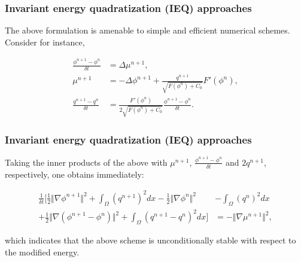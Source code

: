 \documentclass{beamer}
\begin{document}
    \begin{frame}
    \frametitle{Invariant energy quadratization (IEQ) approaches}

The above formulation is amenable to simple and efficient numerical schemes. Consider for instance,

\begin{equation}\label{DisIEQ}
  \begin{split}
\frac{\phi^{n+1}-\phi^{n}}{\delta t}&=\Delta\mu^{n+1},\\
\mu^{n+1}&=-\Delta\phi^{n+1}+\frac{q^{n+1}}{\sqrt{F(\phi^n)+C_0}}F'(\phi^n),\\
\frac{q^{n+1}-q^n}{\delta t}&=\frac{F'(\phi^n)}{2\sqrt{F(\phi^n)+C_0}}\frac{\phi^{n+1}-\phi^{n}}{\delta t}.
  \end{split}
\end{equation}

    \end{frame}
    \begin{frame}
    \frametitle{Invariant energy quadratization (IEQ) approaches}

Taking the inner products of the above with $\mu^{n+1}$, $\frac{\phi^{n+1}-\phi^n}{\delta t}$ and $2q^{n+1}$, respectively, one obtains immediately:

\begin{equation}\label{haosan}
  \begin{split}
\frac{1}{\delta t}[\frac{1}{2}\Vert\nabla\phi^{n+1}\Vert^2+\int_{\Omega}{(q^{n+1})}^2dx-\frac{1}{2}\Vert\nabla\phi^n\Vert^2&-\int_{\Omega}{(q^n)}^2dx\\
+\frac{1}{2}\Vert\nabla(\phi^{n+1}-\phi^n)\Vert^2+\int_{\Omega}(q^{n+1}-q^n)^2dx]&=-\Vert\nabla\mu^{n+1}\Vert^2,
\end{split}
\end{equation}

which indicates that the above scheme is unconditionally stable with respect to the modified energy.

    \end{frame}
\end{document}
